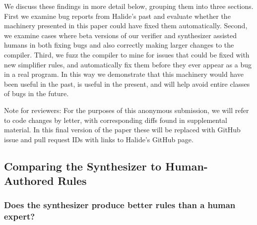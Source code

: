 \documentclass[acmsmall,review]{acmart}\settopmatter{printfolios=true,printccs=false,printacmref=false}
\begin{document}
We discuss these findings in more detail below, grouping them into three sections. First we examine bug reports from Halide’s past and evaluate whether the machinery presented in this paper could have fixed them automatically. Second, we examine cases where beta versions of our verifier and synthesizer assisted humans in both fixing bugs and also correctly making larger changes to the compiler. Third, we fuzz the compiler to mine for issues that could be fixed with new simplifier rules, and automatically fix them before they ever appear as a bug in a real program. In this way we demonstrate that this machinery would have been useful in the past, is useful in the present, and will help avoid entire classes of bugs in the future.

Note for reviewers: For the purposes of this anonymous submission, we will refer to code changes by letter, with corresponding diffs found in supplemental material. In this final version of the paper these will be replaced with GitHub issue and pull request IDs with links to Halide’s GitHub page.

\subsection{Comparing the Synthesizer to Human-Authored Rules}

\subsubsection{Does the synthesizer produce better rules than a human expert?}
\label{sub:bugfixes}



\end{document}
